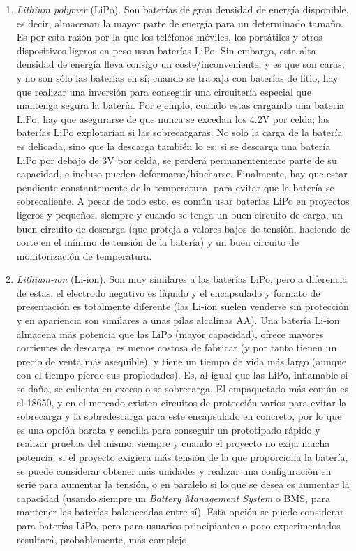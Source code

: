 \documentclass[12pt]{article}
\begin{document}
	\begin{enumerate}
		
		\item \textit{Lithium polymer} (LiPo).  Son baterías de gran densidad de energía disponible, es decir, almacenan la mayor parte de energía para un determinado tamaño. Es por esta razón por la que los teléfonos móviles, los portátiles y otros dispositivos ligeros en peso usan baterías LiPo. Sin embargo, esta alta densidad de energía lleva consigo un coste/inconveniente, y es que son caras, y no son sólo las baterías en sí; cuando se trabaja con baterías de litio, hay que realizar una inversión para conseguir una circuitería especial que mantenga segura la batería. Por ejemplo, cuando estas cargando una batería LiPo, hay que asegurarse de que nunca se excedan los 4.2V por celda; las baterías LiPo explotarían si las sobrecargaras. No solo la carga de la batería es delicada, sino que la descarga también lo es; si se descarga una batería LiPo por debajo de 3V por celda, se perderá permanentemente parte de su capacidad, e incluso pueden deformarse/hincharse. Finalmente, hay que estar pendiente constantemente de la temperatura, para evitar que la batería se sobrecaliente. A pesar de todo esto, es común usar baterías LiPo en proyectos ligeros y pequeños, siempre y cuando se tenga un buen circuito de carga, un buen circuito de descarga (que proteja a valores bajos de tensión, haciendo de corte en el mínimo de tensión de la batería) y un buen circuito de monitorización de temperatura. 
		
		\item \textit{Lithium-ion} (Li-ion). Son muy similares a las baterías LiPo, pero a diferencia de estas, el electrodo negativo es líquido y el encapsulado y formato de presentación es totalmente diferente (las Li-ion suelen venderse sin protección y en apariencia son similares a unas pilas alcalinas AA). Una batería Li-ion almacena más potencia que las LiPo (mayor capacidad), ofrece mayores corrientes de descarga, es menos costosa de fabricar (y por tanto tienen un precio de venta más asequible),  y tiene un tiempo de vida más largo (aunque con el tiempo pierde sus propiedades). Es, al igual que las LiPo, inflamable si se daña, se calienta en exceso o se sobrecarga. El empaquetado más común es el 18650, y en el mercado existen circuitos de protección varios para evitar la sobrecarga y la sobredescarga  para este encapsulado en concreto, por lo que es una opción barata y sencilla para conseguir un prototipado rápido y realizar pruebas del mismo, siempre y cuando el proyecto no exija mucha potencia; si el proyecto exigiera más tensión de la que proporciona la batería, se puede considerar obtener más unidades y realizar una configuración en serie para aumentar la tensión, o en paralelo si lo que se desea es aumentar la capacidad (usando siempre un \textit{Battery Management System} o BMS, para mantener las baterías balanceadas entre sí). Esta opción se puede considerar para baterías LiPo, pero para usuarios principiantes o poco experimentados resultará, probablemente, más complejo.
		

\end{enumerate}
\end{document}
